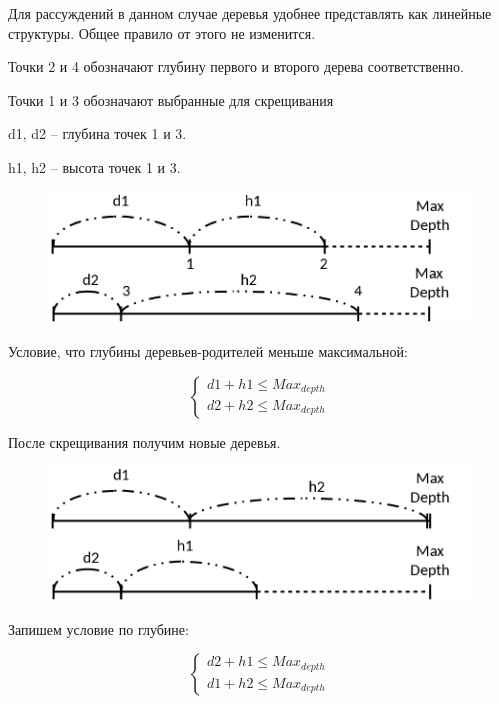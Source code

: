 Для рассуждений в данном случае деревья удобнее представлять как линейные структуры. Общее правило от этого не изменится.

Точки 2 и 4 обозначают глубину первого и второго дерева соответственно.

Точки 1 и 3 обозначают выбранные для скрещивания 

d1, d2 -- глубина точек 1 и 3.

h1, h2 -- высота точек 1 и 3.

\begin{figure}[!h]
\centering
\includegraphics[scale=0.7]{research/pics/6.png}
\label{figure:arrayGoodNodes1}
\end{figure}

Условие, что глубины деревьев-родителей меньше максимальной:

\begin{equation}
\label{equation:goodNodesEq1}
\begin{cases} d1 + h1 \leq Max_{depth} \\ d2 + h2 \leq Max_{depth} \end{cases}
\end{equation}

После скрещивания получим новые деревья. 

\begin{figure}[!h]
\centering
\includegraphics[scale=0.7]{research/pics/7.png}
\label{figure:arrayGoodNodes2}
\end{figure}

Запишем условие по глубине:

\begin{equation}
\label{equation:goodNodesEq2}
\begin{cases}d2 + h1 \leq Max_{depth} \\  d1 + h2 \leq Max_{depth} \end{cases}
\end{equation}

